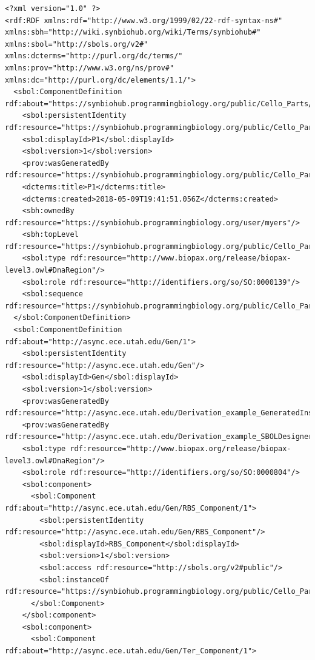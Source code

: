 \begin{lstlisting}
<?xml version="1.0" ?>
<rdf:RDF xmlns:rdf="http://www.w3.org/1999/02/22-rdf-syntax-ns#" xmlns:sbh="http://wiki.synbiohub.org/wiki/Terms/synbiohub#" xmlns:sbol="http://sbols.org/v2#" xmlns:dcterms="http://purl.org/dc/terms/" xmlns:prov="http://www.w3.org/ns/prov#" xmlns:dc="http://purl.org/dc/elements/1.1/">
  <sbol:ComponentDefinition rdf:about="https://synbiohub.programmingbiology.org/public/Cello_Parts/P1/1">
    <sbol:persistentIdentity rdf:resource="https://synbiohub.programmingbiology.org/public/Cello_Parts/P1"/>
    <sbol:displayId>P1</sbol:displayId>
    <sbol:version>1</sbol:version>
    <prov:wasGeneratedBy rdf:resource="https://synbiohub.programmingbiology.org/public/Cello_Parts/CelloUCF2sbol_Activity/1"/>
    <dcterms:title>P1</dcterms:title>
    <dcterms:created>2018-05-09T19:41:51.056Z</dcterms:created>
    <sbh:ownedBy rdf:resource="https://synbiohub.programmingbiology.org/user/myers"/>
    <sbh:topLevel rdf:resource="https://synbiohub.programmingbiology.org/public/Cello_Parts/P1/1"/>
    <sbol:type rdf:resource="http://www.biopax.org/release/biopax-level3.owl#DnaRegion"/>
    <sbol:role rdf:resource="http://identifiers.org/so/SO:0000139"/>
    <sbol:sequence rdf:resource="https://synbiohub.programmingbiology.org/public/Cello_Parts/P1_sequence/1"/>
  </sbol:ComponentDefinition>
  <sbol:ComponentDefinition rdf:about="http://async.ece.utah.edu/Gen/1">
    <sbol:persistentIdentity rdf:resource="http://async.ece.utah.edu/Gen"/>
    <sbol:displayId>Gen</sbol:displayId>
    <sbol:version>1</sbol:version>
    <prov:wasGeneratedBy rdf:resource="http://async.ece.utah.edu/Derivation_example_GeneratedInstance21_SBOLDesignerActivity/1"/>
    <prov:wasGeneratedBy rdf:resource="http://async.ece.utah.edu/Derivation_example_SBOLDesignerActivity/1"/>
    <sbol:type rdf:resource="http://www.biopax.org/release/biopax-level3.owl#DnaRegion"/>
    <sbol:role rdf:resource="http://identifiers.org/so/SO:0000804"/>
    <sbol:component>
      <sbol:Component rdf:about="http://async.ece.utah.edu/Gen/RBS_Component/1">
        <sbol:persistentIdentity rdf:resource="http://async.ece.utah.edu/Gen/RBS_Component"/>
        <sbol:displayId>RBS_Component</sbol:displayId>
        <sbol:version>1</sbol:version>
        <sbol:access rdf:resource="http://sbols.org/v2#public"/>
        <sbol:instanceOf rdf:resource="https://synbiohub.programmingbiology.org/public/Cello_Parts/P1/1"/>
      </sbol:Component>
    </sbol:component>
    <sbol:component>
      <sbol:Component rdf:about="http://async.ece.utah.edu/Gen/Ter_Component/1">

\end{lstlisting}
